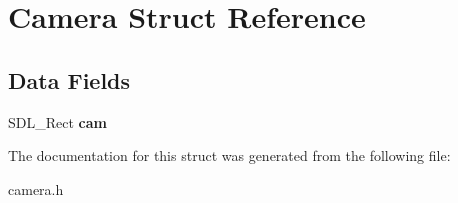 \hypertarget{structCamera}{}\section{Camera Struct Reference}
\label{structCamera}
\subsection*{Data Fields}
\begin{DoxyCompactItemize}
\item 
S\+D\+L\+\_\+\+Rect {\bfseries cam}\hypertarget{structCamera_aee011d811420168bf4f2cf115322a92e}{}\label{structCamera_aee011d811420168bf4f2cf115322a92e}

\end{DoxyCompactItemize}


The documentation for this struct was generated from the following file\+:\begin{DoxyCompactItemize}
\item 
camera.\+h\end{DoxyCompactItemize}
